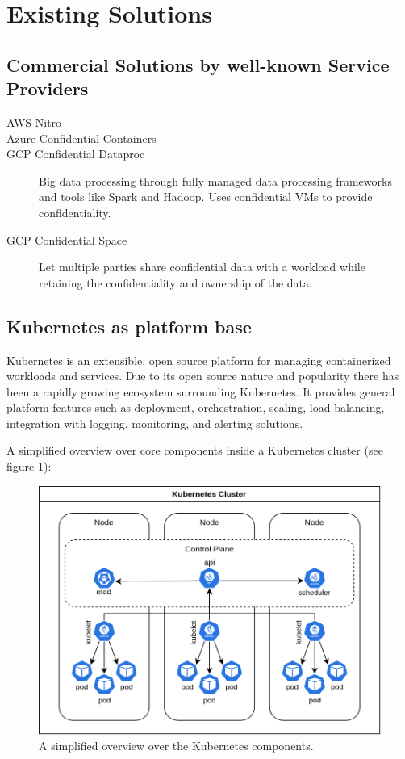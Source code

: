\section{Existing Solutions}

\subsection{Commercial Solutions by well-known Service Providers}

\begin{description}
  \item[AWS Nitro]
  \item[Azure Confidential Containers]
  \item[GCP Confidential Dataproc]
    Big data processing through fully managed data processing frameworks and
    tools like Spark and Hadoop. Uses confidential VMs to provide
    confidentiality.
  \item[GCP Confidential Space]
    Let multiple parties share confidential data with a workload while retaining
    the confidentiality and ownership of the data.
\end{description}


\subsection{Kubernetes as platform base}

Kubernetes is an extensible, open source platform for managing containerized
workloads and services. Due to its open source nature and popularity there has
been a rapidly growing ecosystem surrounding Kubernetes. It provides general
platform features such as deployment, orchestration, scaling, load-balancing,
integration with logging, monitoring, and alerting solutions.

A simplified overview over core components inside a Kubernetes cluster (see
figure \ref{fig:kubernetes-overview}):

\begin{figure}
  \centering
  \includegraphics[width=0.8\linewidth]{resources/kubernetes-overview.png}
  \caption{A simplified overview over the Kubernetes components.}
  \label{fig:kubernetes-overview}
\end{figure}

